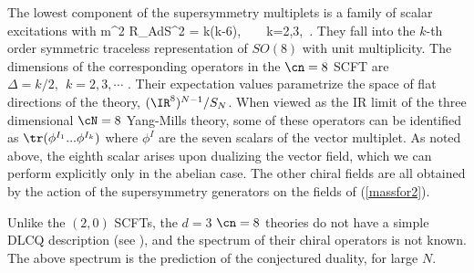 The lowest component of the supersymmetry multiplets is a
family of scalar excitations with
\beq
m^2 R_{AdS}^2 = k(k-6),~~~~k=2,3,\cdots \ .
\label{massfor2}
\eeq
They fall into the $k$-th order symmetric traceless representation of
$SO(8)$ with unit multiplicity.  The dimensions of the corresponding
operators in the $\cn=8$ SCFT are $\Delta=k/2,~~k=2,3,\cdots$ 
\cite{Aharony:1998mt, Minwalla:1998po, Halyo:1998so}.  Their
expectation values parametrize the space of flat directions of the
theory, $(\IR^8)^{N-1}/S_N$.  When viewed as the IR limit of the three
dimensional $\cN=8$ Yang-Mills theory, some of these operators can be
identified as $\tr(\phi^{I_1}...\phi^{I_k})$ where $\phi^I$ are the seven
scalars of the vector multiplet.  As noted above, the eighth scalar
arises upon dualizing the vector field, which we can perform
explicitly only in the abelian case. The other chiral fields are all
obtained by the action of the supersymmetry generators on the fields
of (\ref{massfor2}).


Unlike the $(2,0)$ SCFTs, the $d=3$ $\cn=8$ theories do not have a
simple DLCQ description (see \cite{Ganor:1998jx}), and the spectrum of
their chiral operators is not known.  The above spectrum is the
prediction of the conjectured duality, for large $N$.
 
